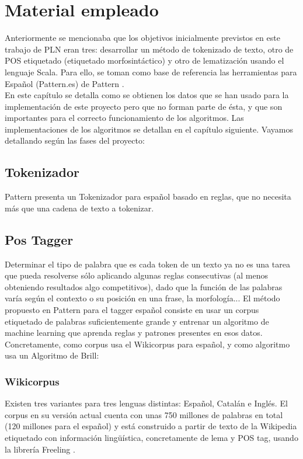 
\chapter{Material empleado}
\label{conclusion}
Anteriormente se mencionaba que los objetivos inicialmente previstos en este trabajo de PLN eran tres: desarrollar un método de tokenizado de texto, otro de POS etiquetado (etiquetado morfosintáctico) y otro de lematización usando el lenguaje \textsf{Scala}. Para ello, se toman como base de referencia las herramientas para Español (Pattern.es) de \textcolor{SchoolColor}{Pattern} \citet{smedt2012pattern}. 
\\[\baselineskip]
En este capítulo se detalla como se obtienen los datos que se han usado para la implementación de este proyecto pero que no forman parte de ésta, y que son importantes para el correcto funcionamiento de los algoritmos. Las implementaciones de los algoritmos se detallan en el capítulo siguiente. 
Vayamos detallando según las fases del proyecto: 
\section{Tokenizador}
\textcolor{SchoolColor}{Pattern} presenta un Tokenizador para español basado en reglas, 
que no necesita más que una cadena de texto a tokenizar.
\section{Pos Tagger}
Determinar el tipo de palabra que es cada token de un texto ya no es una tarea que pueda resolverse sólo aplicando algunas reglas consecutivas (al menos obteniendo resultados algo competitivos), dado que la función de las palabras varía según el contexto o su posición en una frase, la morfología...
\newline
El método propuesto en \textcolor{SchoolColor}{Pattern} para el tagger español consiste en usar un corpus etiquetado de palabras suficientemente grande y entrenar un algoritmo de machine learning que aprenda reglas y patrones presentes en esos datos. Concretamente, como corpus usa el \textcolor{SchoolColor}{Wikicorpus} \citet{reese2010word} para español, y como algoritmo usa un \textcolor{SchoolColor}{Algoritmo de Brill}:    
\subsection*{Wikicorpus}
Existen tres variantes para tres lenguas distintas: Español, Catalán e Inglés. El corpus en su versión actual cuenta con unas 750 millones de palabras en total (120 millones para el español) y está construido a partir de texto de la Wikipedia etiquetado con información lingüística, concretamente de lema y POS tag, usando la librería \textsf{Freeling} \citet{padro2012freeling}.
